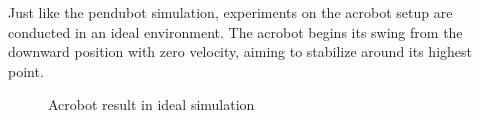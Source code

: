 Just like the pendubot simulation, experiments on the acrobot setup are conducted in an ideal environment. The acrobot begins its swing from the downward position with zero velocity, aiming to stabilize around its highest point.

\begin{figure}[H]
    \centering
    \caption{Acrobot result in ideal simulation}
    \label{fig:ideal_simulation_acrobot}
\end{figure}

